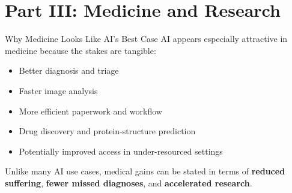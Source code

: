\documentclass[aspectratio=169,11pt]{beamer}
\begin{document}
\section{Part III: Medicine and Research}

\begin{frame}{Why Medicine Looks Like AI's Best Case}
AI appears especially attractive in medicine because the stakes are tangible:
\begin{itemize}
    \item Better diagnosis and triage
    \item Faster image analysis
    \item More efficient paperwork and workflow
    \item Drug discovery and protein-structure prediction
    \item Potentially improved access in under-resourced settings
\end{itemize}

\vspace{0.2cm}
Unlike many AI use cases, medical gains can be stated in terms of \textbf{reduced suffering}, \textbf{fewer missed diagnoses}, and \textbf{accelerated research}.
\end{frame}
\end{document}
